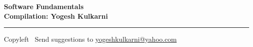 
\graphicspath{{images/}}
% 
% 
% 
% 

% 
%


\footnotesize


\begin{center}
\Large{\textbf{Software Fundamentals\\ Compilation: Yogesh Kulkarni}}  
\end{center}

\begin{multicols}{2}

\end{multicols}

\rule{\linewidth}{0.25pt}
\scriptsize
Copyleft \textcopyleft\  Send suggestions to 
\href{http://www.yogeshkulkarni.com}{yogeshkulkarni@yahoo.com}



